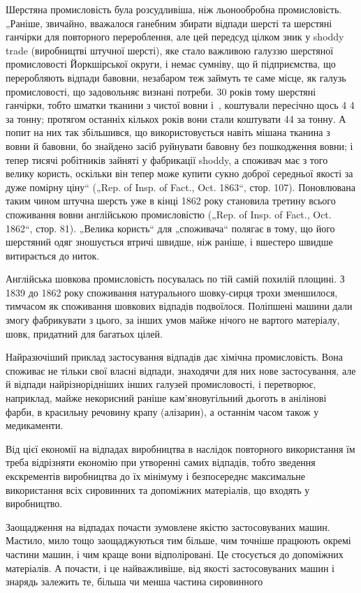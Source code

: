 
Шерстяна промисловість була розсудливіша, ніж льонообробна промисловість. „Раніше, звичайно,
вважалося ганебним
збирати відпади шерсті та шерстяні ганчірки для повторного
перероблення, але цей передсуд цілком зник у shoddy trade
(виробництві штучної шерсті), яке стало важливою галуззю
шерстяної промисловості Йоркшірської округи, і немає сумніву,
що й підприємства, що переробляють відпади бавовни, незабаром теж займуть те саме місце, як галузь
промисловості, що
задовольняє визнані потреби. 30 років тому шерстяні ганчірки,
тобто шматки тканини з чистої вовни і~, коштували пересічно щось 4 4
за тонну; протягом
останніх кількох років вони стали коштувати 44 за тонну. А попит на них так
збільшився, що використовується
навіть мішана тканина з вовни й бавовни, бо знайдено засіб
руйнувати бавовну без пошкодження вовни; і тепер тисячі робітників зайняті у фабрикації shoddy, а
споживач має з того
велику користь, оскільки він тепер може купити сукно доброї
середньої якості за дуже помірну ціну“ („Rep. of Insp. of Fact.,
Oct. 1863“, стор. 107). Поновлювана таким чином штучна шерсть
уже в кінці 1862 року становила третину всього споживання
вовни англійською промисловістю („Rep. of Insp. of Fact., Oct.
1862“, стор. 81). „Велика користь“ для „споживача“ полягає в тому,
що його шерстяний одяг зношується втричі швидше, ніж раніше,
і вшестеро швидше витирається до ниток.

Англійська шовкова промисловість посувалась по тій самій
похилій площині. З 1839 до 1862 року споживання натурального
шовку-сирця трохи зменшилося, тимчасом як споживання шовкових відпадів подвоїлося. Поліпшені машини
дали змогу фабрикувати з цього, за інших умов майже нічого не вартого матеріалу, шовк, придатний для
багатьох цілей.

Найразючіший приклад застосування відпадів дає хімічна
промисловість. Вона споживає не тільки свої власні відпади,
знаходячи для них нове застосування, але й відпади найрізнорідніших інших галузей промисловості, і
перетворює, наприклад,
майже некорисний раніше кам’яновугільний дьоготь в анілінові
фарби, в красильну речовину крапу (алізарин), а останнім часом
також у медикаменти.

Від цієї економії на відпадах виробництва в наслідок повторного використання їм треба відрізняти
економію при утворенні
самих відпадів, тобто зведення екскрементів виробництва до
їх мінімуму і безпосереднє максимальне використання всіх сировинних та допоміжних матеріалів, що
входять у виробництво.

Заощадження на відпадах почасти зумовлене якістю застосовуваних машин. Мастило, мило тощо
заощаджуються тим
більше, чим точніше працюють окремі частини машин, і чим краще
вони відполіровані. Це стосується до допоміжних матеріалів.
А почасти, і це найважливіше, від якості застосовуваних машин
і знарядь залежить те, більша чи менша частина сировинного
\parbreak{}  %
